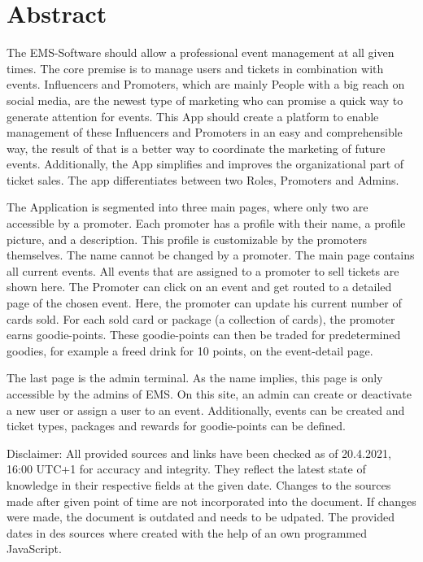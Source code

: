 \chapter{Abstract}
The EMS-Software should allow a professional event management at all given times. The core premise is to manage users and tickets in combination with events.
Influencers and Promoters, which are mainly People with a big reach on social media, are the newest type of marketing who can promise a quick way to generate attention for events.
This App should create a platform to enable management of these Influencers and Promoters in an easy and comprehensible way, the result of that is a better way to coordinate the marketing of future events.
Additionally, the App simplifies and improves the organizational part of ticket sales. The app differentiates between two Roles, Promoters and Admins.

The Application is segmented into three main pages, where only two are accessible by a promoter.
Each promoter has a profile with their name, a profile picture, and a description.
This profile is customizable by the promoters themselves. The name cannot be changed by a promoter.
The main page contains all current events. All events that are assigned to a promoter to sell tickets are shown here. The Promoter can click on an event and get routed to a detailed page of the chosen event.
Here, the promoter can update his current number of cards sold. For each sold card or package (a collection of cards), the promoter earns goodie-points.
These goodie-points can then be traded for predetermined goodies, for example a freed drink for 10 points, on the event-detail page.

The last page is the admin terminal. As the name implies, this page is only accessible by the admins of EMS. On this site, an admin can create or deactivate a new user or assign a user to an event.
Additionally, events can be created and ticket types, packages and rewards for goodie-points can be defined.

Disclaimer: All provided sources and links have been checked as of 20.4.2021, 16:00 UTC+1 for accuracy and integrity.
They reflect the latest state of knowledge in their respective fields at the given date.
Changes to the sources made after given point of time are not incorporated into the document.
If changes were made, the document is outdated and needs to be udpated.
The provided dates in des sources where created with the help of an own programmed JavaScript.